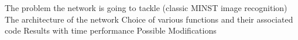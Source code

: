 \startsection[title=Implementation]
\startitemize
\startitem 
The problem the network is going to tackle (classic MINST image recognition)
\stopitem
\startitem
The architecture of the network
\stopitem
\startitem
Choice of various functions and their associated code
\stopitem
\startitem
Results with time performance
\stopitem
\startitem
Possible Modifications
\stopitem
\stopitemize
\stopsection